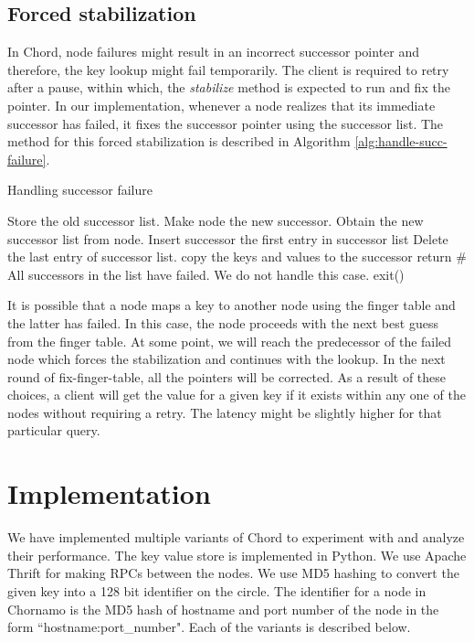 \documentclass{sig-alternate-10pt}
\begin{document}
\subsection{Forced stabilization}
In Chord, node failures might result in an incorrect successor pointer and therefore, the key lookup might fail temporarily. The client is required to retry after a pause, within which, the \textit{stabilize} method is expected to run and fix the pointer. In our implementation, whenever a node realizes that its immediate successor has failed, it fixes the successor pointer using the successor list. The method for this forced stabilization is described in Algorithm \ref{alg:handle-succ-failure}.
\begin{algorithm}[t]
\caption{Handling successor failure} \label{alg:handle-succ-failure}
\begin{algorithmic}
            \State Store the old successor list.
            \State Make node the new successor.
            \State Obtain the new successor list from node.
            \State Insert successor the first entry in successor list
            \State Delete the last entry of successor list.
                \State copy the keys and values to the successor
            \EndFor
            \State return
        \EndIf
    \EndFor
    \# All successors in the list have failed. We do not handle this case.
    \State exit()
\end{algorithmic}
\end{algorithm}

It is possible that a node maps a key to another node using the finger table and the latter has failed. In this case, the node proceeds with the next best guess from the finger table. At some point, we will reach the predecessor of the failed node which forces the stabilization and continues with the lookup. In the next round of fix-finger-table, all the pointers will be corrected. As a result of these choices, a client will get the value for a given key if it exists within any one of the nodes without requiring a retry. The latency might be slightly higher for that particular query.

\section{Implementation}
We have implemented multiple variants of Chord to experiment with and analyze their performance. The key value store is implemented in Python. We use Apache Thrift \cite{thrift} for making RPCs between the nodes. We use MD5 hashing to convert the given key into a 128 bit identifier on the circle. The identifier for a node in Chornamo is the MD5 hash of hostname and port number of the node in the form ``hostname:port\_number".  Each of the variants is described below.
\end{document}
